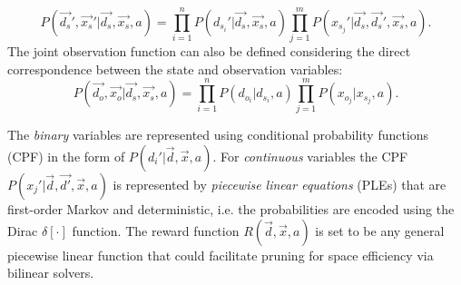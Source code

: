 \documentclass{article} %
\begin{document}
{\footnotesize
\begin{equation}
P(\vec{d_s}',\vec{x_s}'|\vec{d_s},\vec{x_s},a) = 
\prod_{i=1}^n P(d_{s_i}'|\vec{d_s},\vec{x_s},a) \prod_{j=1}^m P(x_{s_j}'|\vec{d_s},\vec{d_s}',\vec{x_s},a). \nonumber 
\end{equation}}
The joint observation function can also be defined considering the direct correspondence between the state and observation variables:
{\footnotesize
\begin{equation}
P(\vec{d_o},\vec{x_o}|\vec{d_s},\vec{x_s},a) = 
\prod_{i=1}^n P(d_{o_i}|d_{s_i},a) \prod_{j=1}^m P(x_{o_j}|x_{s_j},a). \nonumber 
\end{equation}}

The \emph{binary} variables are represented using conditional probability functions (CPF) in the form of $P(d_i'|\vec{d},\vec{x},a)$. For \emph{continuous} variables
the CPF $P(x_j'|\vec{d},\vec{d'},\vec{x},a)$ is represented by \emph{piecewise
linear equations} (PLEs) that are first-order Markov and deterministic, i.e. the probabilities are encoded using the Dirac $\delta[\cdot]$ function.  The reward function $R(\vec{d},\vec{x},a)$ is set to be any general piecewise linear  function that could facilitate pruning for space efficiency via bilinear solvers. 
\end{document}
